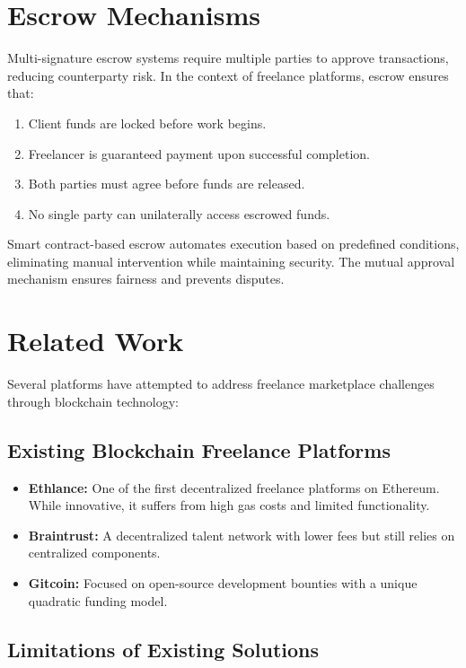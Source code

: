 \section{Escrow Mechanisms}

Multi-signature escrow systems require multiple parties to approve transactions, reducing counterparty risk. In the context of freelance platforms, escrow ensures that:
\begin{enumerate}
    \item Client funds are locked before work begins.
    \item Freelancer is guaranteed payment upon successful completion.
    \item Both parties must agree before funds are released.
    \item No single party can unilaterally access escrowed funds.
\end{enumerate}

Smart contract-based escrow automates execution based on predefined conditions, eliminating manual intervention while maintaining security. The mutual approval mechanism ensures fairness and prevents disputes.

\section{Related Work}

Several platforms have attempted to address freelance marketplace challenges through blockchain technology:

\subsection{Existing Blockchain Freelance Platforms}

\begin{itemize}
    \item \textbf{Ethlance:} One of the first decentralized freelance platforms on Ethereum. While innovative, it suffers from high gas costs and limited functionality.
    \item \textbf{Braintrust:} A decentralized talent network with lower fees but still relies on centralized components.
    \item \textbf{Gitcoin:} Focused on open-source development bounties with a unique quadratic funding model.
\end{itemize}

\subsection{Limitations of Existing Solutions}

